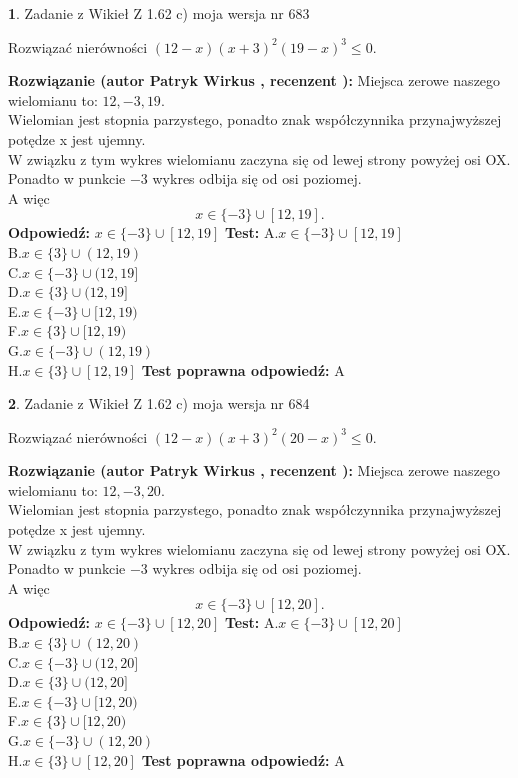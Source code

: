 \documentclass[12pt, a4paper]{article}
\theoremstyle{definition} %
\newtheorem{zad}{}
\newcommand{\zadStart}[1]{\begin{zad}#1\newline}
\newcommand{\zadStop}{\end{zad}}
\newcommand{\rozwStart}[2]{\noindent \textbf{Rozwiązanie (autor #1 , recenzent #2): }\newline}
\newcommand{\rozwStop}{\newline}
\newcommand{\odpStart}{\noindent \textbf{Odpowiedź:}\newline}
\newcommand{\odpStop}{\newline}
\newcommand{\testStart}{\noindent \textbf{Test:}\newline}
\newcommand{\testStop}{\newline}
\newcommand{\kluczStart}{\noindent \textbf{Test poprawna odpowiedź:}\newline}
\newcommand{\kluczStop}{\newline}
\begin{document}
\zadStart{Zadanie z Wikieł Z 1.62 c) moja wersja nr 683}

Rozwiązać nierówności $(12-x)(x+3)^{2}(19-x)^{3}\le0$.
\zadStop
\rozwStart{Patryk Wirkus}{}
Miejsca zerowe naszego wielomianu to: $12, -3, 19$.\\
Wielomian jest stopnia parzystego, ponadto znak współczynnika przy\linebreak najwyższej potędze x jest ujemny.\\ W związku z tym wykres wielomianu zaczyna się od lewej strony powyżej osi OX.\\
Ponadto w punkcie $-3$ wykres odbija się od osi poziomej.\\
A więc $$x \in \{-3\} \cup [12,19].$$
\rozwStop
\odpStart
$x \in \{-3\} \cup [12,19]$
\odpStop
\testStart
A.$x \in \{-3\} \cup [12,19]$\\
B.$x \in \{3\} \cup (12,19)$\\
C.$x \in \{-3\} \cup (12,19]$\\
D.$x \in \{3\} \cup (12,19]$\\
E.$x \in \{-3\} \cup [12,19)$\\
F.$x \in \{3\} \cup [12,19)$\\
G.$x \in \{-3\} \cup (12,19)$\\
H.$x \in \{3\} \cup [12,19]$
\testStop
\kluczStart
A
\kluczStop



\zadStart{Zadanie z Wikieł Z 1.62 c) moja wersja nr 684}

Rozwiązać nierówności $(12-x)(x+3)^{2}(20-x)^{3}\le0$.
\zadStop
\rozwStart{Patryk Wirkus}{}
Miejsca zerowe naszego wielomianu to: $12, -3, 20$.\\
Wielomian jest stopnia parzystego, ponadto znak współczynnika przy\linebreak najwyższej potędze x jest ujemny.\\ W związku z tym wykres wielomianu zaczyna się od lewej strony powyżej osi OX.\\
Ponadto w punkcie $-3$ wykres odbija się od osi poziomej.\\
A więc $$x \in \{-3\} \cup [12,20].$$
\rozwStop
\odpStart
$x \in \{-3\} \cup [12,20]$
\odpStop
\testStart
A.$x \in \{-3\} \cup [12,20]$\\
B.$x \in \{3\} \cup (12,20)$\\
C.$x \in \{-3\} \cup (12,20]$\\
D.$x \in \{3\} \cup (12,20]$\\
E.$x \in \{-3\} \cup [12,20)$\\
F.$x \in \{3\} \cup [12,20)$\\
G.$x \in \{-3\} \cup (12,20)$\\
H.$x \in \{3\} \cup [12,20]$
\testStop
\kluczStart
A
\kluczStop
\end{document}
